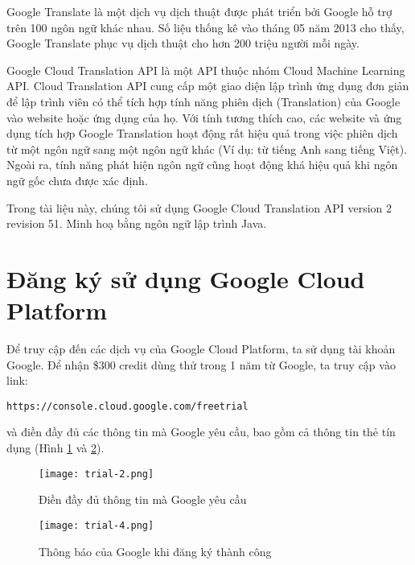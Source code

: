 \documentclass[../thesis.tex]{subfiles}
\begin{document}
Google Translate là một dịch vụ dịch thuật được phát triển bởi Google hỗ trợ trên 100 ngôn ngữ khác nhau. Số liệu thống kê vào tháng 05 năm 2013 cho thấy, Google Translate phục vụ dịch thuật cho hơn 200 triệu người mỗi ngày.

Google Cloud Translation API là một API thuộc nhóm Cloud Machine Learning API. Cloud Translation API cung cấp một giao diện lập trình ứng dụng đơn giản để lập trình viên có thể tích hợp tính năng phiên dịch (Translation) của Google vào website hoặc ứng dụng của họ. Với tính tương thích cao, các website và ứng dụng tích hợp Google Translation hoạt động rất hiệu quả trong việc phiên dịch từ một ngôn ngữ sang một ngôn ngữ khác (Ví dụ: từ tiếng Anh sang tiếng Việt). Ngoài ra, tính năng phát hiện ngôn ngữ cũng hoạt động khá hiệu quả khi ngôn ngữ gốc chưa được xác định.

Trong tài liệu này, chúng tôi sử dụng Google Cloud Translation API version 2 revision 51. Minh hoạ bằng ngôn ngữ lập trình Java. 

\section{Đăng ký sử dụng Google Cloud Platform}
Để truy cập đến các dịch vụ của Google Cloud Platform, ta sử dụng tài khoản Google. Để nhận \$300 credit dùng thử trong 1 năm từ Google, ta truy cập vào link:
\begin{lstlisting}[numbers=none, frame=single,xleftmargin=0.15cm,xrightmargin=0.15cm]
https://console.cloud.google.com/freetrial
\end{lstlisting}
và điền đầy đủ các thông tin mà Google yêu cầu, bao gồm cả thông tin thẻ tín dụng (Hình \ref{Dien day du thong tin ma Google yeu cau} và \ref{Thong bao cua Google khi dang ky thanh cong}).

\begin{figure}
	\texttt{[image: trial-2.png]}
	\caption{Điền đầy đủ thông tin mà Google yêu cầu}
	\label{Dien day du thong tin ma Google yeu cau}
\end{figure}

\begin{figure}
	\texttt{[image: trial-4.png]}
	\caption{Thông báo của Google khi đăng ký thành công}
	\label{Thong bao cua Google khi dang ky thanh cong}
\end{figure}
\end{document}
